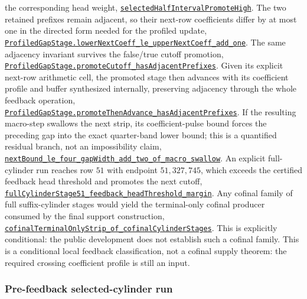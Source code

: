 \documentclass[11pt]{article}
\newcommand{\commit}{81150c1c6fdd4cd51e76d3aa0de344341e0e9e7c}
\newcommand{\repobase}{https://github.com/wcook04/plectis-lean-erdos249-257/blob/\commit}
\newcommand{\PK}{Erdos249257}
\newcommand{\lrefx}[3]{\href{\repobase/\PK/#1\#L#2}{\nolinkurl{#3}}}
\theoremstyle{definition}
\theoremstyle{remark}
\begin{document}
the corresponding head weight,
\lrefx{SuffixCylinderProfiledPromotion.lean}{107}{selectedHalfIntervalPromoteHigh}.
The two retained prefixes remain adjacent, so their next-row coefficients
differ by at most one in the directed form needed for the profiled update,
\lrefx{SuffixCylinderProfiledAdjacency.lean}{232}{ProfiledGapStage.lowerNextCoeff_le_upperNextCoeff_add_one}.
The same adjacency invariant survives the false/true cutoff promotion,
\lrefx{SuffixCylinderProfiledPromotionAdjacency.lean}{65}{ProfiledGapStage.promoteCutoff_hasAdjacentPrefixes}.
Given its explicit next-row arithmetic cell, the promoted stage then advances
with its coefficient profile and buffer synthesized internally, preserving
adjacency through the whole feedback operation,
\lrefx{SuffixCylinderProfiledAutoStep.lean}{110}{ProfiledGapStage.promoteThenAdvance_hasAdjacentPrefixes}.
If the resulting macro-step swallows the next strip, its coefficient-pulse
bound forces the preceding gap into the exact quarter-band lower bound;
this is a quantified residual branch, not an impossibility claim,
\lrefx{SuffixCylinderProfiledSwallow.lean}{254}{nextBound_le_four_gapWidth_add_two_of_macro_swallow}.
An explicit full-cylinder run reaches row $51$ with endpoint $51{,}327{,}745$,
which exceeds the certified feedback head threshold and promotes the next
cutoff,
\lrefx{SuffixCylinderStage51.lean}{536}{fullCylinderStage51_feedback_headThreshold_margin}.
Any cofinal family of full suffix-cylinder stages would yield the terminal-only
cofinal producer consumed by the final support construction,
\lrefx{SuffixCylinderTerminalOnlyBridge.lean}{125}{cofinalTerminalOnlyStrip_of_cofinalCylinderStages}.
This is explicitly conditional: the public development does not establish
such a cofinal family.
This is a conditional local feedback classification, not a cofinal supply
theorem: the required crossing coefficient profile is still an input.

\subsubsection{Pre-feedback selected-cylinder run}\label{res:prefeedback}
\end{document}
